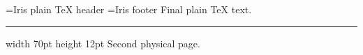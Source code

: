 \headline={Iris plain TeX header\hfil}
\footline={\hfil Iris footer \folio\hfil}
Final plain TeX text.
\vskip 20pt
\hrule width 70pt height 12pt
\vfill\eject
Second physical page.
\bye
